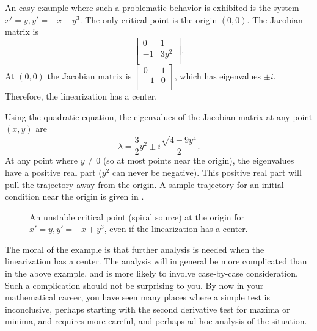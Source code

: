 \documentclass[12pt]{book}
\begin{document}
\begin{example}
An easy example where such a problematic behavior is exhibited is the system
$x'=y, y' = -x+y^3$.  The only critical point
is the origin $(0,0)$.  The Jacobian matrix is 
\begin{equation*}
\begin{bmatrix}
0 & 1 \\
-1 & 3 y^2 \\
\end{bmatrix} .
\end{equation*}
At 
$(0,0)$ the Jacobian matrix is
$\left[ \begin{smallmatrix}
0 & 1 \\
-1 & 0 \\
\end{smallmatrix} \right]$, which has eigenvalues $\pm i$.  Therefore, the
linearization has a center.

Using the quadratic equation, the eigenvalues of the
Jacobian matrix at any point $(x,y)$ are
\begin{equation*}
\lambda = 
\frac{3}{2}y^2 \pm
i
\frac{\sqrt{4-9y^4}}{2} .
\end{equation*}
At any point where $y \not= 0$ (so at most points near the origin), the eigenvalues have a positive real part ($y^2$ can
never be negative).  This positive real part 
will pull the trajectory away from the origin.  A sample trajectory for an
initial condition near the origin is given in
.
\begin{figure}[h!t]
\capstart
\begin{center}
\caption{An unstable critical point (spiral source) at the origin
for $x'=y, y' = -x+y^3$, even if the linearization has a center.  \label{fig:nlin-unstable-center}}
\end{center}
\end{figure}
\end{example}

The moral of the example is that further analysis is needed when the
linearization has a center.  The analysis will in general be more
complicated than in the above example, and is more likely to involve
case-by-case consideration.  Such a complication should not be
surprising to you.  By now in your mathematical career, you have
seen many places where a simple test is inconclusive, perhaps starting with
the second derivative test for maxima or minima, and requires more careful,
and perhaps ad hoc analysis of the situation.
\end{document}
